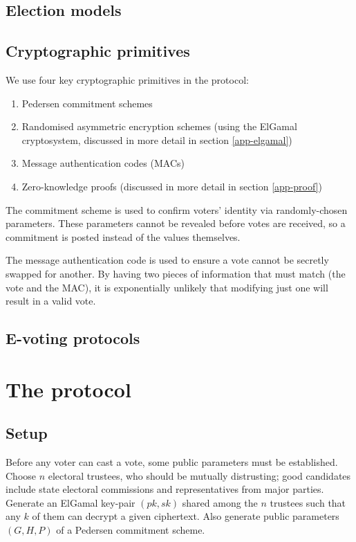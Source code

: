 \documentclass[11pt,twoside,a4paper]{article}
\theoremstyle{definition}
\begin{document}
\subsection{Election models}
\subsection{Cryptographic primitives}
We use four key cryptographic primitives in the protocol:
\begin{enumerate}
    \item Pedersen commitment schemes
    \item Randomised asymmetric encryption schemes (using the ElGamal cryptosystem, discussed in more detail in section \ref{app-elgamal})
    \item Message authentication codes (MACs)
    \item Zero-knowledge proofs (discussed in more detail in section \ref{app-proof})
\end{enumerate}
The commitment scheme is used to confirm voters' identity via randomly-chosen parameters. These parameters cannot be revealed before votes are received, so a commitment is posted instead of the values themselves.

The message authentication code is used to ensure a vote cannot be secretly swapped for another. By having two pieces of information that must match (the vote and the MAC), it is exponentially unlikely that modifying just one will result in a valid vote.
\subsection{E-voting protocols}
\section{The protocol}\label{sec-protocol}
\subsection{Setup}
Before any voter can cast a vote, some public parameters must be established. Choose \(n\) electoral trustees, who should be mutually distrusting; good candidates include state electoral commissions and representatives from major parties. Generate an ElGamal key-pair \((pk, sk)\) shared among the \(n\) trustees such that any \(k\) of them can decrypt a given ciphertext. Also generate public parameters \((G, H, P)\) of a Pedersen commitment scheme.
\end{document}
